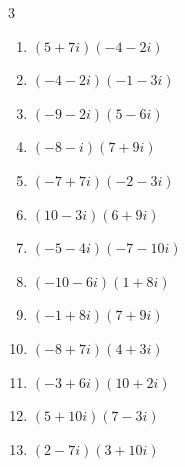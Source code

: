 \begin{multicols}{3}
\begin{enumerate}
        \phantom{$\displaystyle =61+33i$}

  \item $\displaystyle (5+7i)(-4-2i)$

        \phantom{$\displaystyle =-6-38i$}

\columnbreak %

  \item $\displaystyle (-4-2i)(-1-3i)$

        \phantom{$\displaystyle =-2+14i$}

  \item $\displaystyle (-9-2i)(5-6i)$

        \phantom{$\displaystyle =-57+44i$}

  \item $\displaystyle (-8-i)(7+9i)$

        \phantom{$\displaystyle =-47-79i$}

  \item $\displaystyle (-7+7i)(-2-3i)$

        \phantom{$\displaystyle =35+7i$}

  \item $\displaystyle (10-3i)(6+9i)$

        \phantom{$\displaystyle =87+72i$}

  \item $\displaystyle (-5-4i)(-7-10i)$

        \phantom{$\displaystyle =-5+78i$}

  \item $\displaystyle (-10-6i)(1+8i)$

        \phantom{$\displaystyle =38-86i$}

  \item $\displaystyle (-1+8i)(7+9i)$

        \phantom{$\displaystyle =-79+47i$}

  \item $\displaystyle (-8+7i)(4+3i)$

        \phantom{$\displaystyle =-53+4i$}

  \item $\displaystyle (-3+6i)(10+2i)$

        \phantom{$\displaystyle =-42+54i$}

  \item $\displaystyle (5+10i)(7-3i)$

        \phantom{$\displaystyle =65+55i$}

  \item $\displaystyle (2-7i)(3+10i)$


\end{enumerate}
\end{multicols}
